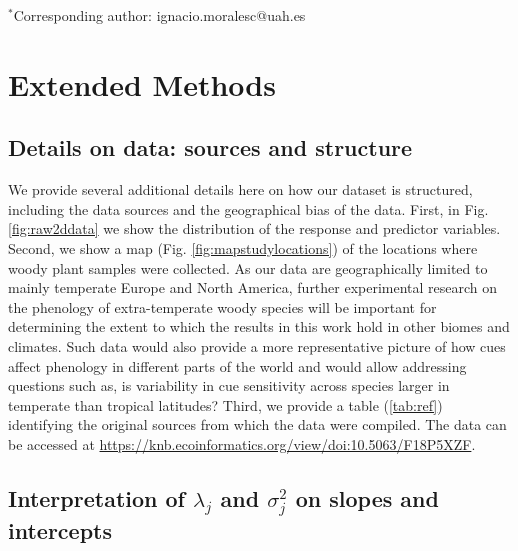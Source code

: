 \documentclass[11pt]{article}
\def\labelitemi{--}
\begin{document}
\vspace{2ex}
$^*$Corresponding author: ignacio.moralesc@uah.es\\
\renewcommand{\thetable}{S\arabic{table}}
\renewcommand{\thefigure}{S\arabic{figure}}
\renewcommand{\labelitemi}{$-$}

\clearpage



\section*{Extended Methods}

\subsection*{Details on data: sources and structure}

We provide several additional details here on how our dataset is structured, including the data sources and the geographical bias of the data. First, in Fig. \ref{fig:raw2ddata} we show the distribution of the response and predictor variables. Second, we show a map (Fig. \ref{fig:mapstudylocations}) of the locations where woody plant samples were collected. As our data are geographically limited to mainly temperate Europe and North America, further experimental research on the phenology of extra-temperate woody species will be important for determining the extent to which the results in this work hold in other biomes and climates. Such data would also provide a more representative picture of how cues affect phenology in different parts of the world and would allow addressing questions such as, is variability in cue sensitivity across species larger in temperate than tropical latitudes? Third, we provide a table (\ref{tab:ref}) identifying the original sources from which the data were compiled. The data can be accessed at \url{https://knb.ecoinformatics.org/view/doi:10.5063/F18P5XZF}.%


  
\subsection*{Interpretation of $\lambda_j$ and $\sigma_j^2$ on slopes and intercepts}
\end{document}
